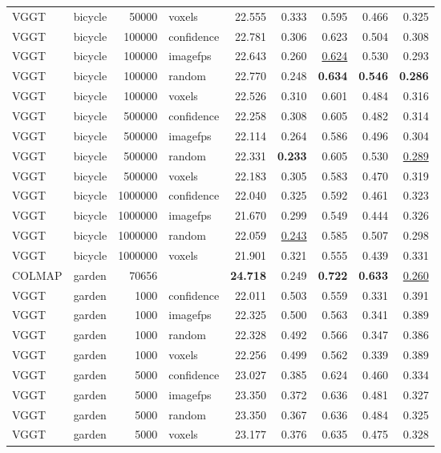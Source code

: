 \begin{table}[H]
\begin{tabular}{llrlrrrrr}
VGGT & bicycle & 50000 & voxels & 22.555 & 0.333 & 0.595 & 0.466 & 0.325 \\
VGGT & bicycle & 100000 & confidence & 22.781 & 0.306 & 0.623 & 0.504 & 0.308 \\
VGGT & bicycle & 100000 & imagefps & 22.643 & 0.260 & \underline{0.624} & 0.530 & 0.293 \\
VGGT & bicycle & 100000 & random & 22.770 & 0.248 & \textbf{0.634} & \textbf{0.546} & \textbf{0.286} \\
VGGT & bicycle & 100000 & voxels & 22.526 & 0.310 & 0.601 & 0.484 & 0.316 \\
VGGT & bicycle & 500000 & confidence & 22.258 & 0.308 & 0.605 & 0.482 & 0.314 \\
VGGT & bicycle & 500000 & imagefps & 22.114 & 0.264 & 0.586 & 0.496 & 0.304 \\
VGGT & bicycle & 500000 & random & 22.331 & \textbf{0.233} & 0.605 & 0.530 & \underline{0.289} \\
VGGT & bicycle & 500000 & voxels & 22.183 & 0.305 & 0.583 & 0.470 & 0.319 \\
VGGT & bicycle & 1000000 & confidence & 22.040 & 0.325 & 0.592 & 0.461 & 0.323 \\
VGGT & bicycle & 1000000 & imagefps & 21.670 & 0.299 & 0.549 & 0.444 & 0.326 \\
VGGT & bicycle & 1000000 & random & 22.059 & \underline{0.243} & 0.585 & 0.507 & 0.298 \\
VGGT & bicycle & 1000000 & voxels & 21.901 & 0.321 & 0.555 & 0.439 & 0.331 \\
\midrule
COLMAP & garden & 70656 &  & \textbf{24.718} & 0.249 & \textbf{0.722} & \textbf{0.633} & \underline{0.260} \\
VGGT & garden & 1000 & confidence & 22.011 & 0.503 & 0.559 & 0.331 & 0.391 \\
VGGT & garden & 1000 & imagefps & 22.325 & 0.500 & 0.563 & 0.341 & 0.389 \\
VGGT & garden & 1000 & random & 22.328 & 0.492 & 0.566 & 0.347 & 0.386 \\
VGGT & garden & 1000 & voxels & 22.256 & 0.499 & 0.562 & 0.339 & 0.389 \\
VGGT & garden & 5000 & confidence & 23.027 & 0.385 & 0.624 & 0.460 & 0.334 \\
VGGT & garden & 5000 & imagefps & 23.350 & 0.372 & 0.636 & 0.481 & 0.327 \\
VGGT & garden & 5000 & random & 23.350 & 0.367 & 0.636 & 0.484 & 0.325 \\
VGGT & garden & 5000 & voxels & 23.177 & 0.376 & 0.635 & 0.475 & 0.328 \\

\end{tabular}
\end{table}

